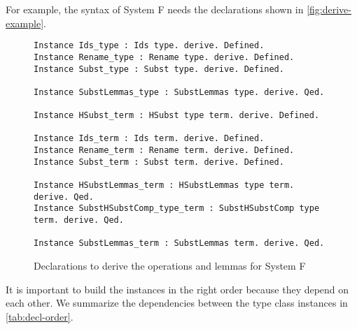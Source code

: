 \documentclass{scrartcl}
\begin{document}
For example, the syntax of System F needs the declarations shown in \autoref{fig:derive-example}.
\begin{figure}
  \centering
\begin{lstlisting}
Instance Ids_type : Ids type. derive. Defined.
Instance Rename_type : Rename type. derive. Defined.
Instance Subst_type : Subst type. derive. Defined.

Instance SubstLemmas_type : SubstLemmas type. derive. Qed.

Instance HSubst_term : HSubst type term. derive. Defined.

Instance Ids_term : Ids term. derive. Defined.
Instance Rename_term : Rename term. derive. Defined.
Instance Subst_term : Subst term. derive. Defined.

Instance HSubstLemmas_term : HSubstLemmas type term. derive. Qed.
Instance SubstHSubstComp_type_term : SubstHSubstComp type term. derive. Qed.

Instance SubstLemmas_term : SubstLemmas term. derive. Qed.
\end{lstlisting}
  \caption{Declarations to derive the operations and lemmas for System F}
  \label{fig:derive-example}
\end{figure}
It is important to build the instances in the right order because they depend on each other.
We summarize the dependencies between the type class instances in \autoref{tab:decl-order}.
\end{document}
